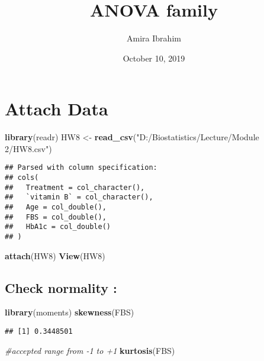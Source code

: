 \documentclass[]{article}
\title{ANOVA family}
\author{Amira Ibrahim}
\date{October 10, 2019}
\newenvironment{Shaded}{\begin{snugshade}}{\end{snugshade}}
\newcommand{\KeywordTok}[1]{\textcolor[rgb]{0.13,0.29,0.53}{\textbf{#1}}}
\newcommand{\StringTok}[1]{\textcolor[rgb]{0.31,0.60,0.02}{#1}}
\newcommand{\CommentTok}[1]{\textcolor[rgb]{0.56,0.35,0.01}{\textit{#1}}}
\newcommand{\NormalTok}[1]{#1}
\begin{document}
\maketitle

\section{Attach Data}\label{attach-data}

\begin{Shaded}
\begin{Highlighting}[]
\KeywordTok{library}\NormalTok{(readr) }
\NormalTok{HW8 <-}\StringTok{ }\KeywordTok{read_csv}\NormalTok{(}\StringTok{"D:/Biostatistics/Lecture/Module 2/HW8.csv"}\NormalTok{)}
\end{Highlighting}
\end{Shaded}

\begin{verbatim}
## Parsed with column specification:
## cols(
##   Treatment = col_character(),
##   `vitamin B` = col_character(),
##   Age = col_double(),
##   FBS = col_double(),
##   HbA1c = col_double()
## )
\end{verbatim}

\begin{Shaded}
\begin{Highlighting}[]
\KeywordTok{attach}\NormalTok{(HW8)}
\KeywordTok{View}\NormalTok{(HW8)}
\end{Highlighting}
\end{Shaded}

\subsection{Check normality :}\label{check-normality}

\begin{Shaded}
\begin{Highlighting}[]
\KeywordTok{library}\NormalTok{(moments) }
\KeywordTok{skewness}\NormalTok{(FBS)}
\end{Highlighting}
\end{Shaded}

\begin{verbatim}
## [1] 0.3448501
\end{verbatim}

\begin{Shaded}
\begin{Highlighting}[]
\CommentTok{#accepted range from -1 to +1}
\KeywordTok{kurtosis}\NormalTok{(FBS)}
\end{Highlighting}
\end{Shaded}
\end{document}
